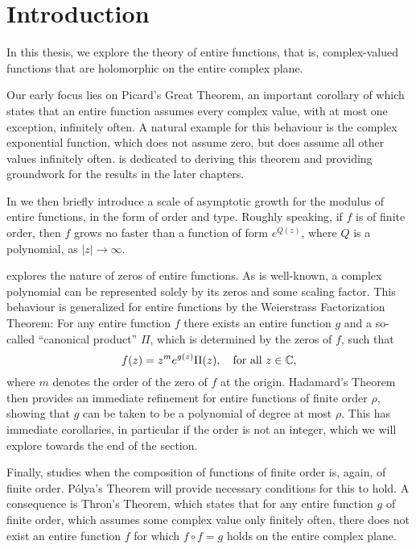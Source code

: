 \chapter{Introduction}
\label{ch:introduction}

In this thesis, we explore the theory of entire functions, that is, complex-valued functions that are holomorphic on the entire complex plane.

Our early focus lies on Picard's Great Theorem, an important corollary of which states that an entire function assumes every complex value, with at most one exception, infinitely often. A natural example for this behaviour is the complex exponential function, which does not assume zero, but does assume all other values infinitely often.  is dedicated to deriving this theorem and providing groundwork for the results in the later chapters.

In  we then briefly introduce a scale of asymptotic growth for the modulus of entire functions, in the form of order and type. Roughly speaking, if $f$ is of finite order, then $f$ grows no faster than a function of form $e^{Q(z)}$, where $Q$ is a polynomial, as $\vert z \vert \to \infty$.

 explores the nature of zeros of entire functions. As is well-known, a complex polynomial can be represented solely by its zeros and some scaling factor. This behaviour is generalized for entire functions by the Weierstrass Factorization Theorem: For any entire function $f$ there exists an entire function $g$ and a so-called ``canonical product'' $\Pi$, which is determined by the zeros of $f$, such that
$$ f(z) = z^m e^{g(z)} \Pi(z), \quad \textrm{for all } z \in \mathbb{C}, $$
where $m$ denotes the order of the zero of $f$ at the origin. Hadamard's Theorem then provides an immediate refinement for entire functions of finite order $\rho$, showing that $g$ can be taken to be a polynomial of degree at most $\rho$. This has immediate corollaries, in particular if the order is not an integer, which we will explore towards the end of the section.

Finally,  studies when the composition of functions of finite order is, again, of finite order. Pólya's Theorem will provide necessary conditions for this to hold. A consequence is Thron's Theorem, which states that for any entire function $g$ of finite order, which assumes some complex value only finitely often, there does not exist an entire function $f$ for which $f \circ f = g$ holds on the entire complex plane.

